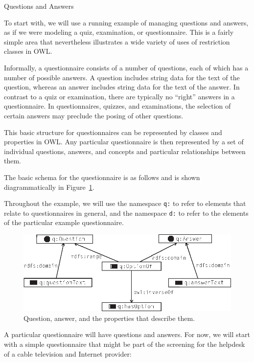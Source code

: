 \begin{example}{Questions and Answers}
\label{ex:ch12.1}

To start with, we will use a running example of managing questions and
answers, as if we were modeling a quiz, examination, or questionnaire.
This is a fairly simple area that nevertheless illustrates a wide
variety of uses of restriction classes in OWL.

Informally, a questionnaire consists of a number of questions, each of
which has a number of possible
answers. A question includes string data for the text of the question,
whereas an answer includes string data for the text of the answer. In
contrast to a quiz or examination, there are typically no ``right''
answers in a questionnaire. In questionnaires, quizzes, and
examinations, the selection of certain answers may preclude the posing
of other questions.

This basic structure for questionnaires can be represented by classes
and properties in OWL. Any
particular questionnaire is then represented by a set of individual
questions, answers, and concepts and particular relationships between
them.

The basic schema for the questionnaire is as follows and is shown
diagrammatically in Figure~\ref{fig:ch12.01}.

Throughout the example, we will use the namespace \texttt{q:} to refer to
elements that relate to questionnaires in general, and the namespace \texttt{d:}
to refer to the elements of the particular example questionnaire.

\begin{figure}
\centering
\includegraphics[width=5in]{media/ch12/f12-01.eps}
\caption{Question, answer, and the properties that describe them.}
\label{fig:ch12.01}
\end{figure}



A particular questionnaire will have questions and answers. For now, we
will start with a simple questionnaire that might be part of the
screening for the helpdesk of a cable television and Internet provider:


\end{example}
